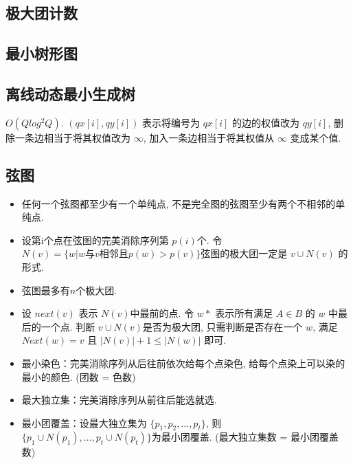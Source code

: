 \documentclass[landscape, twocolumn, 8pt, a4paper, twoside]{extarticle}
\begin{document}
\begin{spacing}{0.1}
\subsection{极大团计数}


\subsection{最小树形图}


\subsection{离线动态最小生成树}
$O (Q log^2 Q) $.
$(qx[i], qy[i])$ 表示将编号为 $qx[i]$ 的边的权值改为 $qy[i]$,
删除一条边相当于将其权值改为 $\infty$,
加入一条边相当于将其权值从 $\infty$ 变成某个值.


\subsection{弦图}
\begin{itemize}
\item 任何一个弦图都至少有一个单纯点, 不是完全图的弦图至少有两个不相邻的单纯点. 
\item 设第i个点在弦图的完美消除序列第 $p(i)$个. 令 $N(v) = \{w | w \text{与} v \text{相邻且} p(w) > p(v) \}$弦图的极大团一定是 $v \cup N(v)$ 的形式. 
\item 弦图最多有$n$个极大团. 
\item 设 $next(v)$ 表示 $N(v)$中最前的点. 令 $w*$ 表示所有满足 $A\in B$ 的 $w$ 中最后的一个点. 
  判断 $v \cup N(v)$是否为极大团,
  只需判断是否存在一个 $w$, 
  满足 $Next(w) = v$ 且 $|N(v)| + 1 \le |N(w)|$ 即可. 
\item 最小染色：完美消除序列从后往前依次给每个点染色, 给每个点染上可以染的最小的颜色. (团数 = 色数)
\item 最大独立集：完美消除序列从前往后能选就选. 
\item 最小团覆盖：设最大独立集为 $\{p_1, p_2, \ldots, p_t\}$, 则 $\{p_1 \cup N(p_1), \ldots, p_t \cup N(p_t) \}$为最小团覆盖.  (最大独立集数 = 最小团覆盖数)
\end{itemize}




\end{spacing}
\end{document}
